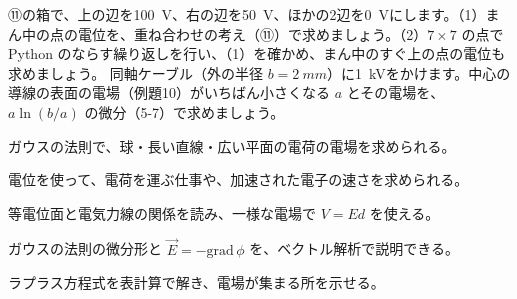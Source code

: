 \bkproblem ⑪の箱で、上の辺を\qty{100}{V}、右の辺を\qty{50}{V}、ほかの2辺を\qty{0}{V}にします。（1）まん中の点の電位を、重ね合わせの考え（⑪）で求めましょう。（2）$7\times7$ の点で Python のならす繰り返しを行い、（1）を確かめ、まん中のすぐ上の点の電位も求めましょう。
\bkproblem 同軸ケーブル（外の半径 $b=\qty{2}{mm}$）に\qty{1}{kV}をかけます。中心の導線の表面の電場（例題10）がいちばん小さくなる $a$ とその電場を、$a\ln(b/a)$ の微分（5-7）で求めましょう。

\begin{furikaeri}
\begin{checklist}
\item ガウスの法則で、球・長い直線・広い平面の電荷の電場を求められる。
\item 電位を使って、電荷を運ぶ仕事や、加速された電子の速さを求められる。
\item 等電位面と電気力線の関係を読み、一様な電場で $V=Ed$ を使える。
\item ガウスの法則の微分形と $\vec E=-\mathrm{grad}\,\phi$ を、ベクトル解析で説明できる。
\item ラプラス方程式を表計算で解き、電場が集まる所を示せる。
\end{checklist}
\end{furikaeri}
